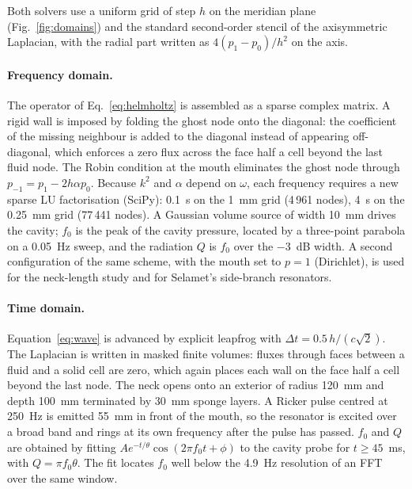 \documentclass[11pt,a4paper]{article}
\begin{document}
Both solvers use a uniform grid of step $h$ on the meridian plane (Fig.~\ref{fig:domains})
and the standard second-order stencil of the axisymmetric Laplacian, with the radial
part written as $4(p_1-p_0)/h^2$ on the axis.

\paragraph{Frequency domain.} The operator of Eq.~\eqref{eq:helmholtz} is assembled as a
sparse complex matrix. A rigid wall is imposed by folding the ghost node onto the diagonal:
the coefficient of the missing neighbour is added to the diagonal instead of appearing
off-diagonal, which enforces a zero flux across the face half a cell beyond the last fluid
node. The Robin condition at the mouth eliminates the ghost node through
$p_{-1} = p_1 - 2h\alpha p_0$. Because $k^2$ and $\alpha$ depend on $\omega$, each frequency
requires a new sparse LU factorisation (SciPy): 0.1~s on the 1~mm grid (4\,961 nodes), 4~s on
the 0.25~mm grid (77\,441 nodes). A Gaussian volume source of width 10~mm drives the cavity;
$f_0$ is the peak of the cavity pressure, located by a three-point parabola on a 0.05~Hz
sweep, and the radiation $Q$ is $f_0$ over the $-3$~dB width. A second configuration of the
same scheme, with the mouth set to $p=1$ (Dirichlet), is used for the neck-length study and
for Selamet's side-branch resonators.

\paragraph{Time domain.} Equation~\eqref{eq:wave} is advanced by explicit leapfrog with
$\Delta t = 0.5\,h/(c\sqrt2)$. The Laplacian is written in masked finite volumes: fluxes
through faces between a fluid and a solid cell are zero, which again places each wall on the
face half a cell beyond the last node. The neck opens onto an exterior of radius 120~mm and
depth 100~mm terminated by 30~mm sponge layers. A Ricker pulse centred at 250~Hz is emitted
55~mm in front of the mouth, so the resonator is excited over a broad band and rings at its
own frequency after the pulse has passed. $f_0$ and $Q$ are obtained by fitting
$A e^{-t/\theta}\cos(2\pi f_0 t+\phi)$ to the cavity probe for $t \ge 45$~ms, with
$Q = \pi f_0 \theta$. The fit locates $f_0$ well below the 4.9~Hz resolution of an FFT over
the same window.
\end{document}
